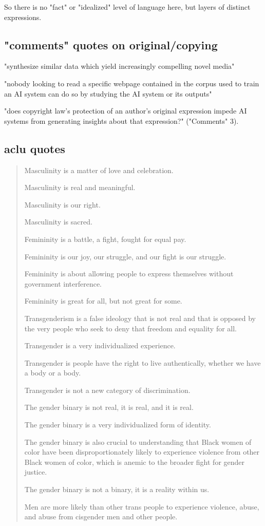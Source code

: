 \documentclass[11pt]{article}
\begin{document}
So there is no "fact" or "idealized" level of language here, but
layers of distinct expressions. 


\subsection{"comments" quotes on original/copying}
\label{sec:org69acded}

"synthesize similar data which yield increasingly compelling novel
media"

"nobody looking to read a specific webpage contained in the corpus
used to train an AI system can do so by studying the AI system or its
outputs"


"does copyright law’s protection of an author’s original expression
impede AI systems from generating insights about that expression?"
("Comments" 3).

\subsection{aclu quotes}
\label{sec:orged820d3}

\begin{quote}
Masculinity is a matter of love and celebration.

Masculinity is real and meaningful.

Masculinity is our right.

Masculinity is sacred.

Femininity is a battle, a fight, fought for equal pay.

Femininity is our joy, our struggle, and our fight is our struggle.

Femininity is about allowing people to express themselves without
government interference.

Femininity is great for all, but not great for some.

Transgenderism is a false ideology that is not real and that is
opposed by the very people who seek to deny that freedom and equality
for all.

Transgender is a very individualized experience.

Transgender is people have the right to live authentically, whether we
have a body or a body.

Transgender is not a new category of discrimination.

The gender binary is not real, it is real, and it is real.

The gender binary is a very individualized form of identity.

The gender binary is also crucial to understanding that Black women of
color have been disproportionately likely to experience violence from
other Black women of color, which is anemic to the broader fight for
gender justice.

The gender binary is not a binary, it is a reality within us.

Men are more likely than other trans people to experience violence,
abuse, and abuse from cisgender men and other people.
\end{quote}
\end{document}
